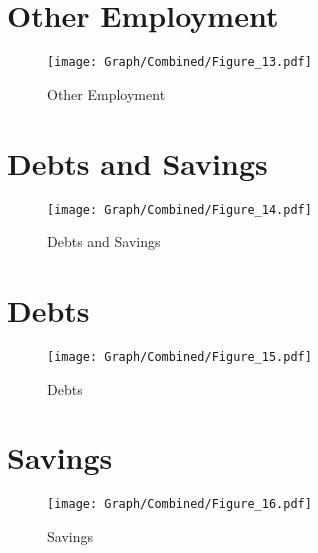 \documentclass[10pt,a4paper]{article}
\begin{document}
\section{Other Employment}
\begin{table}[H]\centering

\end{table}
\begin{figure}[H]\centering
\texttt{[image: Graph/Combined/Figure\_13.pdf]}
\caption{Other Employment} \label{fig:Fig_13}
\end{figure}
\begin{table}[H]\centering

\end{table}
\section{Debts and Savings}
\begin{table}[H]\centering

\end{table}
\begin{figure}[H]\centering
\texttt{[image: Graph/Combined/Figure\_14.pdf]}
\caption{Debts and Savings} \label{fig:Fig_14}
\end{figure}
\begin{table}[H]\centering

\end{table}
\section{Debts}
\begin{table}[H]\centering

\end{table}
\begin{figure}[H]\centering
\texttt{[image: Graph/Combined/Figure\_15.pdf]}
\caption{Debts} \label{fig:Fig_15}
\end{figure}
\begin{table}[H]\centering

\end{table}
\section{Savings}
\begin{table}[H]\centering

\end{table}
\begin{figure}[H]\centering
\texttt{[image: Graph/Combined/Figure\_16.pdf]}
\caption{Savings} \label{fig:Fig_16}
\end{figure}
\begin{table}[H]\centering

\end{table}
\end{document}
